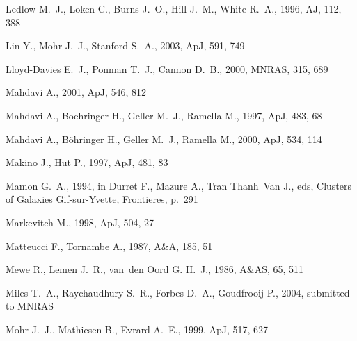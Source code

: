 \documentclass[usenatbib]{mn2e}
\begin{document}
\begin{thebibliography}{}
Ledlow M.~J.,  Loken C.,  Burns J.~O.,  Hill J.~M.,    White R.~A.,  1996, AJ,
  112, 388

Lin Y.,  Mohr J.~J.,    Stanford S.~A.,  2003, ApJ, 591, 749

Lloyd-Davies E.~J.,  Ponman T.~J.,    Cannon D.~B.,  2000, MNRAS, 315, 689

Mahdavi A.,  2001, ApJ, 546, 812

Mahdavi A.,  Boehringer H.,  Geller M.~J.,    Ramella M.,  1997, ApJ, 483, 68

Mahdavi A.,  B{\" o}hringer H.,  Geller M.~J.,    Ramella M.,  2000, ApJ, 534,
  114

Makino J.,  Hut P.,  1997, ApJ, 481, 83

Mamon G.~A.,  1994, in Durret F.,  Mazure A.,   Tran Thanh~Van J.,  eds,
  Clusters of Galaxies Gif-sur-Yvette, Frontieres, p.~291

Markevitch M.,  1998, ApJ, 504, 27

Matteucci F.,  Tornambe A.,  1987, A\&A, 185, 51

Mewe R.,  Lemen J.~R.,    van~den Oord G. H.~J.,  1986, A\&AS, 65, 511

Miles T.~A.,  Raychaudhury S.~R.,  Forbes D.~A.,    Goudfrooij P.,  2004,
  submitted to MNRAS

Mohr J.~J.,  Mathiesen B.,    Evrard A.~E.,  1999, ApJ, 517, 627


\end{thebibliography}
\end{document}
